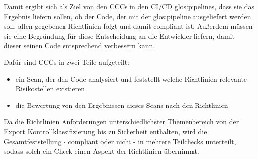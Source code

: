 \documentclass[../main.tex]{subfiles}
\begin{document}
Damit ergibt sich als Ziel von den \glspl{CCC} in den \gls{CI/CD} \glspl{glos:pipeline}, dass sie das Ergebnis liefern sollen, ob der Code, der mit der \gls{glos:pipeline} ausgeliefert werden soll, allen gegebenen Richtlinien folgt und damit compliant ist.
Außerdem müssen sie eine Begründung für diese Entscheidung an die Entwickler liefern, damit dieser seinen Code entsprechend verbessern kann.

Dafür sind \glspl{CCC} in zwei Teile aufgeteilt:
\begin{itemize}
    \item ein Scan, der den Code analysiert und feststellt welche Richtlinien relevante Risikostellen existieren 
    \item die Bewertung von den Ergebnissen dieses Scans nach den Richtlinien
  \end{itemize}

Da die Richtlinien Anforderungen unterschiedlichster Themenbereich von der Export Kontrollklassifizierung bis zu Sicherheit enthalten, wird die Gesamtfeststellung - compliant oder nicht - in mehrere Teilchecks unterteilt, sodass solch ein Check einen Aspekt der Richtlinien übernimmt. 
\end{document}
